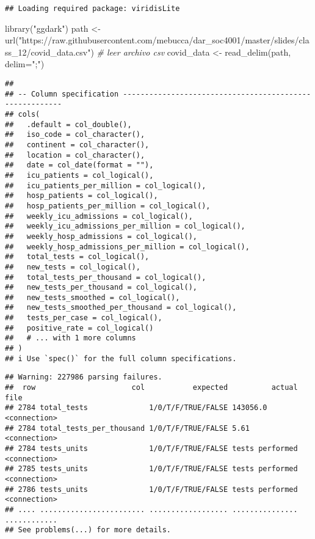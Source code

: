 \documentclass[
]{article}
\newenvironment{Shaded}{\begin{snugshade}}{\end{snugshade}}
\newcommand{\AttributeTok}[1]{\textcolor[rgb]{0.77,0.63,0.00}{#1}}
\newcommand{\CommentTok}[1]{\textcolor[rgb]{0.56,0.35,0.01}{\textit{#1}}}
\newcommand{\FunctionTok}[1]{\textcolor[rgb]{0.00,0.00,0.00}{#1}}
\newcommand{\NormalTok}[1]{#1}
\newcommand{\OtherTok}[1]{\textcolor[rgb]{0.56,0.35,0.01}{#1}}
\newcommand{\StringTok}[1]{\textcolor[rgb]{0.31,0.60,0.02}{#1}}
\begin{document}
\begin{verbatim}
## Loading required package: viridisLite
\end{verbatim}

\begin{Shaded}
\begin{Highlighting}[]
\FunctionTok{library}\NormalTok{(}\StringTok{"ggdark"}\NormalTok{)}
\NormalTok{path }\OtherTok{\textless{}{-}} \FunctionTok{url}\NormalTok{(}\StringTok{"https://raw.githubusercontent.com/mebucca/dar\_soc4001/master/slides/class\_12/covid\_data.csv"}\NormalTok{)}
\CommentTok{\# leer archivo csv}
\NormalTok{covid\_data }\OtherTok{\textless{}{-}} \FunctionTok{read\_delim}\NormalTok{(path, }\AttributeTok{delim=}\StringTok{";"}\NormalTok{)}
\end{Highlighting}
\end{Shaded}

\begin{verbatim}
## 
## -- Column specification --------------------------------------------------------
## cols(
##   .default = col_double(),
##   iso_code = col_character(),
##   continent = col_character(),
##   location = col_character(),
##   date = col_date(format = ""),
##   icu_patients = col_logical(),
##   icu_patients_per_million = col_logical(),
##   hosp_patients = col_logical(),
##   hosp_patients_per_million = col_logical(),
##   weekly_icu_admissions = col_logical(),
##   weekly_icu_admissions_per_million = col_logical(),
##   weekly_hosp_admissions = col_logical(),
##   weekly_hosp_admissions_per_million = col_logical(),
##   total_tests = col_logical(),
##   new_tests = col_logical(),
##   total_tests_per_thousand = col_logical(),
##   new_tests_per_thousand = col_logical(),
##   new_tests_smoothed = col_logical(),
##   new_tests_smoothed_per_thousand = col_logical(),
##   tests_per_case = col_logical(),
##   positive_rate = col_logical()
##   # ... with 1 more columns
## )
## i Use `spec()` for the full column specifications.
\end{verbatim}

\begin{verbatim}
## Warning: 227986 parsing failures.
##  row                      col           expected          actual         file
## 2784 total_tests              1/0/T/F/TRUE/FALSE 143056.0        <connection>
## 2784 total_tests_per_thousand 1/0/T/F/TRUE/FALSE 5.61            <connection>
## 2784 tests_units              1/0/T/F/TRUE/FALSE tests performed <connection>
## 2785 tests_units              1/0/T/F/TRUE/FALSE tests performed <connection>
## 2786 tests_units              1/0/T/F/TRUE/FALSE tests performed <connection>
## .... ........................ .................. ............... ............
## See problems(...) for more details.
\end{verbatim}
\end{document}
